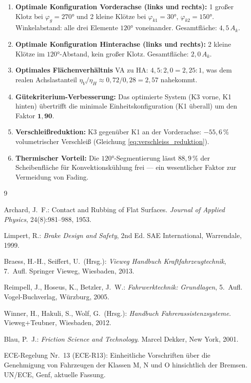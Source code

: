 ﻿\documentclass[12pt,a4paper]{article}
\theoremstyle{definition}
\begin{document}
\begin{enumerate}[leftmargin=2em, itemsep=4pt]
  \item \textbf{Optimale Konfiguration Vorderachse (links und rechts):}
        1 großer Klotz bei $\varphi_g = 270 °$ und 2 kleine Klötze bei
        $\varphi_{k1} = 30 °$, $\varphi_{k2} = 150 °$.
        Winkelabstand: alle drei Elemente $120 °$ voneinander.
        Gesamtfläche: $4{,}5\,A_k$.

  \item \textbf{Optimale Konfiguration Hinterachse (links und rechts):}
        2 kleine Klötze im $120 °$-Abstand, kein großer Klotz.
        Gesamtfläche: $2{,}0\,A_k$.

  \item \textbf{Optimales Flächenverhältnis} VA zu HA:
        $4{,}5 : 2{,}0 = 2{,}25 : 1$, was dem realen Achslastanteil
        $\eta_V / \eta_H \approx 0{,}72 / 0{,}28 = 2{,}57$ nahekommt.

  \item \textbf{Gütekriterium-Verbesserung:}  Das optimierte System
        (K3 vorne, K1 hinten) übertrifft die minimale Einheitskonfiguration
        (K1 überall) um den Faktor $\mathbf{1{,}90}$.

  \item \textbf{Verschleißreduktion:} K3 gegenüber K1 an der Vorderachse:
        $-55{,}6\,\%$ volumetrischer Verschleiß (Gleichung \eqref{eq:verschleiss_reduktion}).

  \item \textbf{Thermischer Vorteil:} Die $120 °$-Segmentierung lässt
        $88{,}9\,\%$ der Scheibenfläche für Konvektionskühlung frei ---
        ein wesentlicher Faktor zur Vermeidung von Fading.
\end{enumerate}

\newpage
\begin{thebibliography}{9}

Archard, J.\ F.:
Contact and Rubbing of Flat Surfaces.
\textit{Journal of Applied Physics}, 24(8):981--988, 1953.

Limpert, R.:
\textit{Brake Design and Safety}, 2nd Ed.
SAE International, Warrendale, 1999.

Braess, H.-H., Seiffert, U.\ (Hrsg.):
\textit{Vieweg Handbuch Kraftfahrzeugtechnik}, 7.\ Aufl.
Springer Vieweg, Wiesbaden, 2013.

Reimpell, J., Hoseus, K., Betzler, J.\ W.:
\textit{Fahrwerktechnik: Grundlagen}, 5.\ Aufl.
Vogel-Buchverlag, Würzburg, 2005.

Winner, H., Hakuli, S., Wolf, G.\ (Hrsg.):
\textit{Handbuch Fahrerassistenzsysteme}.
Vieweg+Teubner, Wiesbaden, 2012.

Blau, P.\ J.:
\textit{Friction Science and Technology}.
Marcel Dekker, New York, 2001.

ECE-Regelung Nr.\ 13 (ECE-R13):
Einheitliche Vorschriften über die Genehmigung von Fahrzeugen der Klassen M, N und O
hinsichtlich der Bremsen.
UN/ECE, Genf, aktuelle Fassung.

\end{thebibliography}
\end{document}
